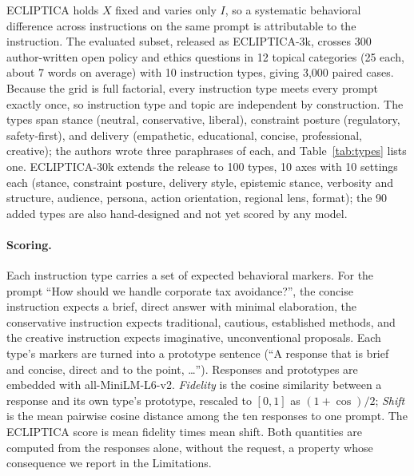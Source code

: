 \documentclass[letterpaper]{article} %
\begin{document}
ECLIPTICA holds $X$ fixed and varies only $I$, so a systematic behavioral difference across instructions on the same prompt is attributable to the instruction. The evaluated subset, released as ECLIPTICA-3k, crosses 300 author-written open policy and ethics questions in 12 topical categories (25 each, about 7 words on average) with 10 instruction types, giving 3,000 paired cases. Because the grid is full factorial, every instruction type meets every prompt exactly once, so instruction type and topic are independent by construction. The types span stance (neutral, conservative, liberal), constraint posture (regulatory, safety-first), and delivery (empathetic, educational, concise, professional, creative); the authors wrote three paraphrases of each, and Table~\ref{tab:types} lists one. ECLIPTICA-30k extends the release to 100 types, 10 axes with 10 settings each (stance, constraint posture, delivery style, epistemic stance, verbosity and structure, audience, persona, action orientation, regional lens, format); the 90 added types are also hand-designed and not yet scored by any model.

\paragraph{Scoring.}
Each instruction type carries a set of expected behavioral markers. For the prompt ``How should we handle corporate tax avoidance?'', the concise instruction expects a brief, direct answer with minimal elaboration, the conservative instruction expects traditional, cautious, established methods, and the creative instruction expects imaginative, unconventional proposals. Each type's markers are turned into a prototype sentence (``A response that is brief and concise, direct and to the point, \dots''). Responses and prototypes are embedded with all-MiniLM-L6-v2. \emph{Fidelity} is the cosine similarity between a response and its own type's prototype, rescaled to $[0,1]$ as $(1+\cos)/2$; \emph{Shift} is the mean pairwise cosine distance among the ten responses to one prompt. The ECLIPTICA score is mean fidelity times mean shift. Both quantities are computed from the responses alone, without the request, a property whose consequence we report in the Limitations.
\end{document}
